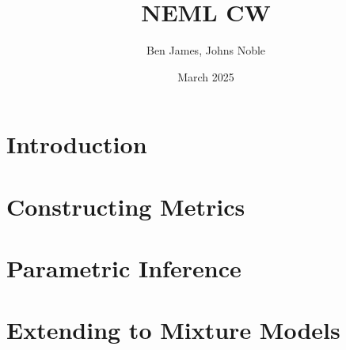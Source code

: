 \documentclass{article}
\title{NEML CW}
\author{Ben James, Johns Noble}
\date{March 2025}
\begin{document}
\maketitle
\tableofcontents
\section{Introduction}
\section{Constructing Metrics}
\section{Parametric Inference}
\section{Extending to Mixture Models}
\end{document}
